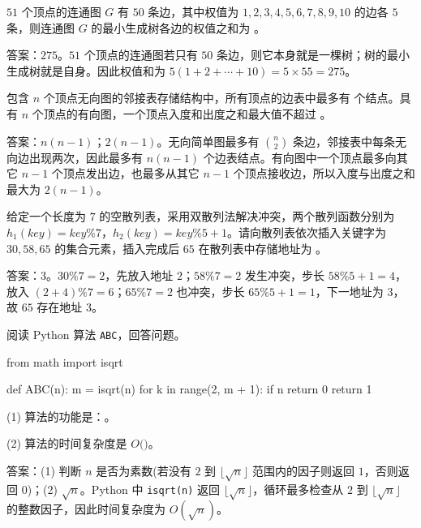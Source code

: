 \begin{question}
$51$ 个顶点的连通图 $G$ 有 $50$ 条边，其中权值为 $1,2,3,4,5,6,7,8,9,10$ 的边各 $5$ 条，则连通图 $G$ 的最小生成树各边的权值之和为 \blank。
\begin{solution}
答案：$275$。$51$ 个顶点的连通图若只有 $50$ 条边，则它本身就是一棵树；树的最小生成树就是自身。因此权值和为 $5(1+2+\cdots+10)=5\times55=275$。
\end{solution}
\end{question}

\begin{question}
包含 $n$ 个顶点无向图的邻接表存储结构中，所有顶点的边表中最多有 \blank 个结点。具有 $n$ 个顶点的有向图，一个顶点入度和出度之和最大值不超过 \blank。
\begin{solution}
答案：$n(n-1)$；$2(n-1)$。无向简单图最多有 $\binom{n}{2}$ 条边，邻接表中每条无向边出现两次，因此最多有 $n(n-1)$ 个边表结点。有向图中一个顶点最多向其它 $n-1$ 个顶点发出边，也最多从其它 $n-1$ 个顶点接收边，所以入度与出度之和最大为 $2(n-1)$。
\end{solution}
\end{question}

\begin{question}
给定一个长度为 $7$ 的空散列表，采用双散列法解决冲突，两个散列函数分别为 $h_1(key)=key\%7$，$h_2(key)=key\%5+1$。请向散列表依次插入关键字为 $30,58,65$ 的集合元素，插入完成后 $65$ 在散列表中存储地址为 \blank。
\begin{solution}
答案：$3$。$30\%7=2$，先放入地址 $2$；$58\%7=2$ 发生冲突，步长 $58\%5+1=4$，放入 $(2+4)\%7=6$；$65\%7=2$ 也冲突，步长 $65\%5+1=1$，下一地址为 $3$，故 $65$ 存在地址 $3$。
\end{solution}
\end{question}


\begin{question}
阅读 Python 算法 \texttt{ABC}，回答问题。
\begin{pycode}
from math import isqrt

def ABC(n):
    m = isqrt(n)
    for k in range(2, m + 1):
        if n %
            return 0
    return 1
\end{pycode}
(1) 算法的功能是：\blank。\par
(2) 算法的时间复杂度是 $O($\blank$)$。
\begin{solution}
答案：(1) 判断 $n$ 是否为素数(若没有 $2$ 到 $\lfloor\sqrt n\rfloor$ 范围内的因子则返回 $1$，否则返回 $0$)；(2) $\sqrt n$。Python 中 \texttt{isqrt(n)} 返回 $\lfloor\sqrt n\rfloor$，循环最多检查从 $2$ 到 $\lfloor\sqrt n\rfloor$ 的整数因子，因此时间复杂度为 $O(\sqrt n)$。
\end{solution}
\end{question}


